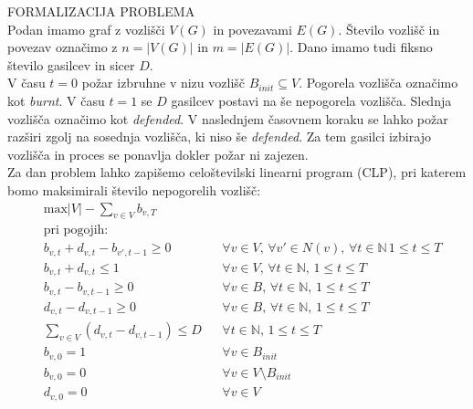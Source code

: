 \documentclass[a4paper, 11pt]{article}
\begin{document}
\noindent FORMALIZACIJA PROBLEMA \\
Podan imamo graf z vozlišči $V\left(G\right)$ in povezavami $E\left(G\right)$.
Število vozlišč in povezav označimo z $n = \left|V\left(G\right)\right|$ in $m = \left|E\left(G\right)\right|$.
Dano imamo tudi fiksno število gasilcev in sicer $D$. \\
V času $t = 0$ požar izbruhne v nizu vozlišč $B_{init} \subseteq V$. Pogorela vozlišča
označimo kot \emph{burnt}.
V času $t = 1$ se $D$ gasilcev postavi na še nepogorela vozlišča. Slednja vozlišča 
označimo kot \emph{defended}.
V naslednjem časovnem koraku se lahko požar razširi zgolj na sosednja vozlišča, ki niso še \emph{defended}.
Za tem gasilci izbirajo vozlišča in proces se ponavlja dokler požar ni zajezen. \\
Za dan problem lahko zapišemo celoštevilski linearni program (CLP), pri katerem
bomo maksimirali število nepogorelih vozlišč:
\begin{align*}
    & \text{max} \left|V\right| - \sum_{v \in V}{b_{v, T}} \\
    & \text{pri pogojih:} \\
    & b_{v,t} + d_{v,t} - b_{v',t-1} \ge 0 && \forall v \in V ,\, \forall v' \in N(v) ,\, \forall t \in \mathbb{N} \, 1 \le t \le T \\
    & b_{v,t} + d_{v,t} \le 1 && \forall v \in V ,\, \forall t \in \mathbb{N} ,\, 1 \le t \le T \\
    & b_{v,t} - b_{v,t-1} \ge 0 && \forall v \in B ,\, \forall t \in \mathbb{N} ,\, 1 \le t \le T \\
    & d_{v,t} - d_{v,t-1} \ge 0 && \forall v \in B ,\, \forall t \in \mathbb{N} ,\, 1 \le t \le T \\
    & \sum_{v \in V}{\left( d_{v,t} - d_{v, t-1} \right)} \le D && \forall t \in \mathbb{N} ,\, 1 \le t \le T \\
    & b_{v,0} = 1 && \forall v \in B_{init} \\
    & b_{v,0} = 0 && \forall v \in V \setminus B_{init} \\
    & d_{v,0} = 0 && \forall v \in V %
\end{align*}

\end{document}
